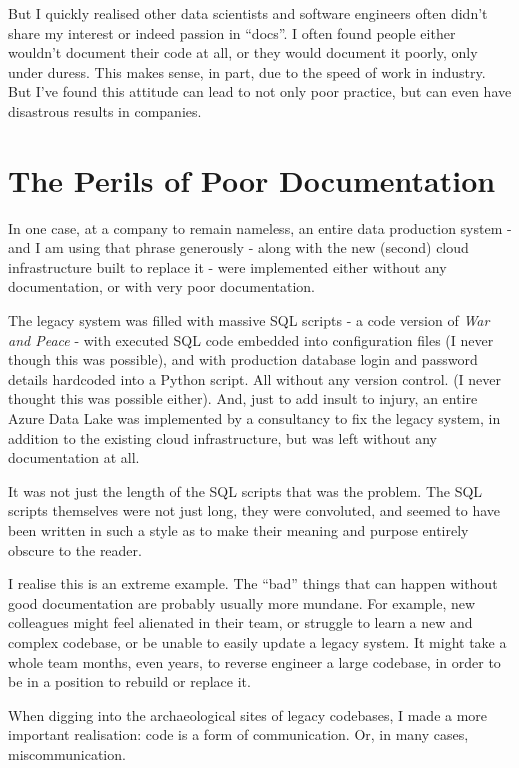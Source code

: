 \documentclass[
  letterpaper,
  DIV=11,
  numbers=noendperiod]{scrartcl}
\begin{document}
But I quickly realised other data scientists and software engineers
often didn't share my interest or indeed passion in ``docs''. I often
found people either wouldn't document their code at all, or they would
document it poorly, only under duress. This makes sense, in part, due to
the speed of work in industry. But I've found this attitude can lead to
not only poor practice, but can even have disastrous results in
companies.

\section{The Perils of Poor
Documentation}\label{the-perils-of-poor-documentation}

In one case, at a company to remain nameless, an entire data production
system - and I am using that phrase generously - along with the new
(second) cloud infrastructure built to replace it - were implemented
either without any documentation, or with very poor documentation.

The legacy system was filled with massive SQL scripts - a code version
of \emph{War and Peace} - with executed SQL code embedded into
configuration files (I never though this was possible), and with
production database login and password details hardcoded into a Python
script. All without any version control. (I never thought this was
possible either). And, just to add insult to injury, an entire Azure
Data Lake was implemented by a consultancy to fix the legacy system, in
addition to the existing cloud infrastructure, but was left without any
documentation at all.

It was not just the length of the SQL scripts that was the problem. The
SQL scripts themselves were not just long, they were convoluted, and
seemed to have been written in such a style as to make their meaning and
purpose entirely obscure to the reader.

I realise this is an extreme example. The ``bad'' things that can happen
without good documentation are probably usually more mundane. For
example, new colleagues might feel alienated in their team, or struggle
to learn a new and complex codebase, or be unable to easily update a
legacy system. It might take a whole team months, even years, to reverse
engineer a large codebase, in order to be in a position to rebuild or
replace it.

When digging into the archaeological sites of legacy codebases, I made a
more important realisation: code is a form of communication. Or, in many
cases, miscommunication.
\end{document}
